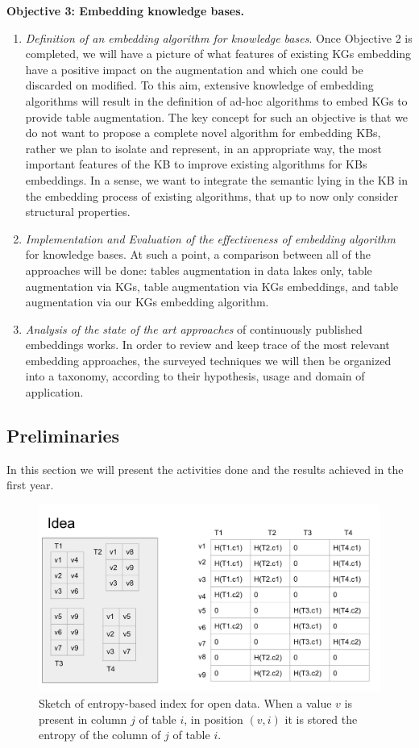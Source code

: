 \noindent\textbf{Objective 3: Embedding knowledge bases.}
\begin{enumerate}
    \item \textit{Definition of an embedding algorithm for knowledge bases}. Once Objective 2 is completed, we will have a picture of what features of existing KGs embedding have a positive impact on the augmentation and which one could be discarded on modified. To this aim, extensive knowledge of embedding algorithms will result in the definition of ad-hoc algorithms to embed KGs to provide table augmentation. The key concept for such an objective is that we do not want to propose a complete novel algorithm for embedding KBs, rather we plan to isolate and represent, in an appropriate way, the most important features of the KB to improve existing algorithms for KBs embeddings. In a sense, we want to integrate the semantic lying in the KB in the embedding process of existing algorithms, that up to now only consider structural properties.
    \item \textit{Implementation and Evaluation of the effectiveness of embedding algorithm} for knowledge bases. At such a point, a comparison between all of the approaches will be done: tables augmentation in data lakes only, table augmentation via KGs, table augmentation via KGs embeddings, and table augmentation via our KGs embedding algorithm.
    \item  \textit{Analysis of the state of the art approaches} of continuously published embeddings works. In order to review and keep trace of the most relevant embedding approaches, the surveyed techniques we will then be organized into a taxonomy, according to their hypothesis, usage and domain of application.
\end{enumerate}



\subsection{Preliminaries}\label{sub_preliminaries}
In this section we will present the activities done and the results achieved in the first year.

\begin{figure}[t]\label{index_sketch}
    \includegraphics[scale=0.4]{figures/index_sketch.png}
    \caption{Sketch of entropy-based index for open data. When a value $v$ is present in column $j$ of table $i$, in position $(v,i)$ it is stored the entropy of the column of $j$ of table $i$.}
\end{figure}

